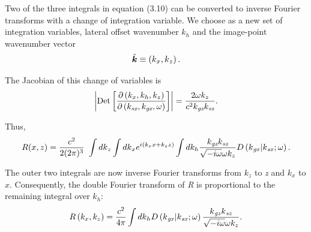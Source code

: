 Two of the three integrals in equation (3.10) can be converted to inverse Fourier transforms with a change of integration variable. We choose
as a new set of \nobreak integration variables, lateral offset wavenumber \(k_h\) and the image-point wavenumber vector
\begin{equation}
\tilde{\boldsymbol{k}}\equiv \left(\text{\textit{$k$}}_{\text{\textit{$x$}}},\text{\textit{$k$}}_{\text{\textit{$z$}}}\right).\end{equation}

The Jacobian of this change of variables is
\begin{equation}\left|\text{Det}\left[\frac{\partial \left(\text{\textit{$k_x$}},\text{\textit{$k_h$}},\text{\textit{$k_z$}}\right)}{\partial \left(\text{\textit{$k_{\text{sx}}$}},\text{\textit{$k_{\text{gx}}$}},\omega
\right)}\right]\right|=\frac{2 \omega  \text{\textit{$k_z$}}}{\text{\textit{$c$}}^2\text{\textit{$k_{\text{gz}}$}}\text{\textit{$k_{\text{sz}}$}}}.\end{equation}

Thus,
\begin{equation}\text{\textit{$R$}}(\text{\textit{$x,z$}}) = \frac{\text{\textit{$c$}}^2}{2(2\pi )^3}\text{  }\int d\text{\textit{$k$}}_{\text{\textit{$z$}}}\int
d\text{\textit{$k$}}_{\text{\textit{$x$}}}e^{i(\text{\textit{$k_xx$}}+\text{\textit{$k_zz$}})}\int d\text{\textit{$k_h$}}\frac{ \text{\textit{$k_{\text{gz}}k_{\text{sz}}$}}}{\sqrt{-i
\omega } \omega  \text{\textit{$k_z$}}}\text{\textit{$D$}}\left(\text{\textit{$k$}}_{\text{\textit{gx}}}|\text{\textit{$k$}}_{\text{\textit{sx}}};\omega
\right) .\end{equation}

The outer two integrals are now inverse Fourier transforms from \(k_z\) to \textit{z} and \(k_x\) to \(x\). Consequently, the double Fourier
transform of \textit{R} is proportional to the remaining integral over \(k_h\):
\begin{equation}\text{\textit{$R$}}\left(\text{\textit{$k_x$}},\text{\textit{$k_z$}}\right) =\frac{\text{\textit{$c$}}^2}{4\pi } \int d\text{\textit{$k$}}_{\text{\textit{$h$}}}\text{\textit{$D$}}\left(\text{\textit{$k$}}_{\text{\textit{gx}}}|\text{\textit{$k$}}_{\text{\textit{sx}}};\omega
\right) \frac{\text{\textit{$k$}}_{\text{\textit{gz}}}\text{\textit{$k$}}_{\text{\textit{sz}}}}{\sqrt{-i \omega } \omega  \text{\textit{$k_z$}}}.\end{equation}


